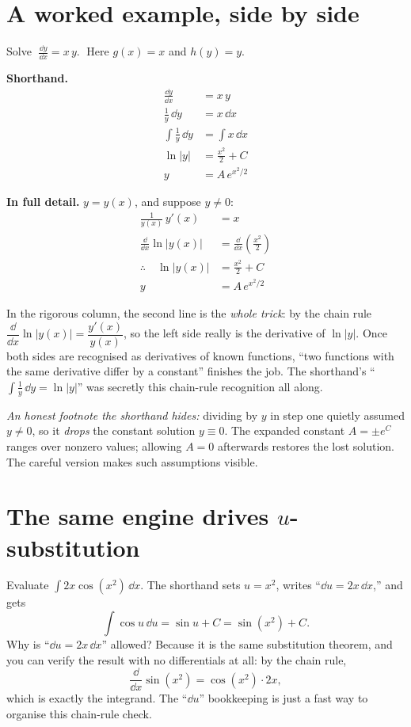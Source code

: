 \documentclass{essay}
\newcommand{\ddx}[1]{\frac{\dd #1}{\dd x}}
\begin{document}
\section{A worked example, side by side}

Solve \(\;\ddx{y} = x\,y.\;\) Here \(g(x)=x\) and \(h(y)=y\).

\textbf{Shorthand.}
\[
  \begin{aligned}
    \ddx{y} &= x\,y \\[3pt]
    \frac{1}{y}\,\dd y &= x\,\dd x \\[3pt]
    \int \frac{1}{y}\,\dd y &= \int x\,\dd x \\[3pt]
    \ln|y| &= \tfrac{x^{2}}{2} + C \\[3pt]
    y &= A\,e^{x^{2}/2}
  \end{aligned}
\]

\textbf{In full detail.}
\(y=y(x)\), and suppose \(y\neq 0\):
\[
  \begin{aligned}
    \frac{1}{y(x)}\,y'(x) &= x \\[3pt]
    \frac{\dd}{\dd x}\ln|y(x)| &= \frac{\dd}{\dd
    x}\!\left(\tfrac{x^{2}}{2}\right) \\[3pt]
    \therefore\quad \ln|y(x)| &= \tfrac{x^{2}}{2} + C \\[3pt]
    y &= A\,e^{x^{2}/2}
  \end{aligned}
\]

In the rigorous column, the second line is the \emph{whole trick}: by
the chain rule \(\dfrac{\dd}{\dd x}\ln|y(x)| = \dfrac{y'(x)}{y(x)}\),
so the left side really is the derivative of \(\ln|y|\). Once both
sides are recognised as derivatives of known functions, ``two
functions with the same derivative differ by a constant'' finishes
the job. The shorthand's ``\(\int \tfrac{1}{y}\,\dd y = \ln|y|\)'' was
secretly this chain-rule recognition all along.

\textit{An honest footnote the shorthand hides:} dividing by \(y\) in
step one quietly assumed \(y\neq 0\), so it \emph{drops} the constant
solution \(y\equiv 0\). The expanded constant \(A=\pm e^{C}\) ranges over
nonzero values; allowing \(A=0\) afterwards restores the lost solution.
The careful version makes such assumptions visible.

\section{The same engine drives \(u\)-substitution}

Evaluate \(\displaystyle\int 2x\cos(x^{2})\,\dd x\). The shorthand sets
\(u=x^{2}\), writes ``\(\dd u = 2x\,\dd x\),'' and gets
\[ \int \cos u \,\dd u = \sin u + C = \sin(x^{2})+C. \]
Why is ``\(\dd u = 2x\,\dd x\)'' allowed? Because it is the same
substitution theorem, and you can verify the result with no
differentials at all: by the chain rule,
\[ \frac{\dd}{\dd x}\sin(x^{2}) = \cos(x^{2})\cdot 2x, \]
which is exactly the integrand. The ``\(\dd u\)'' bookkeeping is just a
fast way to organise this chain-rule check.
\end{document}
